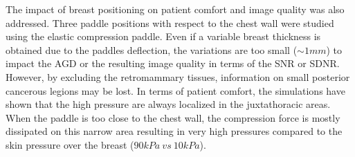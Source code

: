 The impact of breast positioning on patient comfort and image quality was also addressed. Three paddle positions with respect to the chest wall were studied using the elastic compression paddle. Even if a variable breast thickness is obtained due to the paddles deflection, the variations are too small ($\sim 1mm$) to impact the AGD or the resulting image quality in terms of the SNR or SDNR. However, by excluding the retromammary tissues, information on small posterior cancerous legions may be lost. In terms of patient comfort, the simulations have shown that the high pressure are always localized in the juxtathoracic areas. When the paddle is too close to the chest wall, the compression force is mostly dissipated on this narrow area resulting in very high pressures compared to the skin pressure over the breast ($90kPa\ vs\ 10kPa$).
